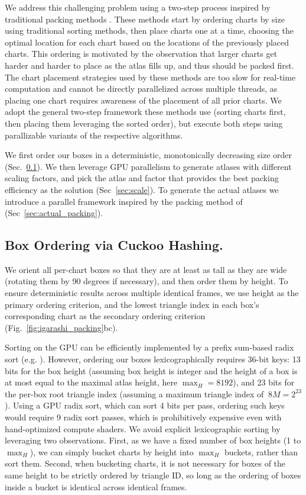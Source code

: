 We address this challenging problem using a two-step process inspired by traditional packing methods \cite{levy2002least,igarashi2001adaptive}. These methods start by ordering charts by size using traditional sorting methods, then place charts one at a time, choosing the optimal location for each chart based on the locations of the previously placed charts. This ordering is motivated by the observation that larger charts get harder and harder to place as the atlas fills up, and thus should be packed first. The chart placement strategies used by these methods are too slow for real-time computation and cannot be directly parallelized across multiple threads, as placing one chart requires awareness of the placement of all prior charts. We adopt the general two-step framework these methods use (sorting charts first, then placing them leveraging the sorted order), but execute both steps using parallizable variants of the respective algorithms.

We first order our boxes in a deterministic, monotonically decreasing size order (Sec.~\ref{sec:order}). We then leverage GPU parallelism to generate atlases with different scaling factors, and pick the atlas and factor that provides the best packing efficiency as the solution (Sec~\ref{sec:scale}). To generate the actual atlases we introduce a parallel framework inspired by the packing method of \cite{igarashi2001adaptive} (Sec~\ref{sec:actual_packing}).

\subsection{Box Ordering via Cuckoo Hashing.}
\label{sec:order}
We orient all per-chart boxes so that they are at least as tall as they are wide (rotating them by 90 degrees if necessary), and then order them by height. To ensure deterministic results across multiple identical frames, we use height as the primary ordering criterion, and the lowest triangle index in each box's corresponding chart as the secondary ordering criterion (Fig.~\ref{fig:igarashi_packing}bc).

Sorting on the GPU can be efficiently implemented by a prefix sum-based radix sort (e.g. \cite{merrill2011high}). However, ordering our boxes lexicographically requires 36-bit keys: 13 bits for the box height (assuming box height is integer and the height of a box is at most equal to the maximal atlas height, here $\max_H=8192$), and 23 bits for the per-box root triangle index (assuming a maximum triangle index of $~8M = 2^{23}$). Using a GPU radix sort, which can sort 4 bits per pass, ordering such keys would require 9 radix sort passes, which is prohibitively expensive even with hand-optimized compute shaders. We avoid explicit lexicographic sorting by leveraging two observations. First, as we have a fixed number of box heights (1 to $\max_H$), we can simply bucket charts by height into $\max_H$ buckets, rather than sort them. Second, when bucketing charts, it is not necessary for boxes of the same height to be strictly ordered by triangle ID, so long as the ordering of boxes inside a bucket is identical across identical frames.

